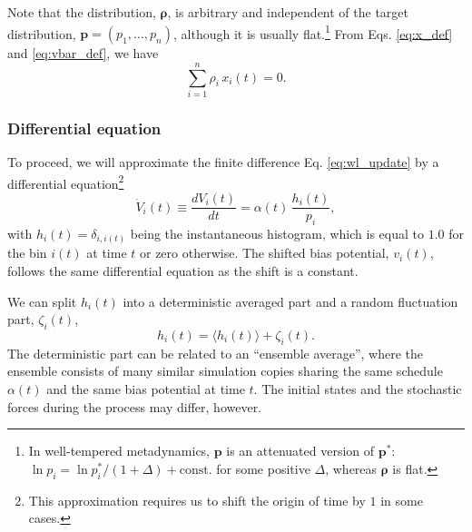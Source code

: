 \documentclass[reprint, superscriptaddress, floatfix]{revtex4-1}
\begin{document}
%
Note that the distribution, $\pmb\rho$, is arbitrary
and independent of
the target distribution,
$\mathbf p = (p_1, \dots, p_n)$,
although it is usually flat.\footnote{In
well-tempered metadynamics,
$\mathbf p$ is an attenuated version of
$\mathbf p^*$\cite{
  barducci2008, dama2014}:
$\ln p_i = \ln {p^*_i}/(1+\Delta) + \mathrm{const.}$ for some positive $\Delta$,
whereas $\pmb\rho$ is flat.}
%
From Eqs. \eqref{eq:x_def} and \eqref{eq:vbar_def},
we have
%
\begin{equation}
  \sum_{i = 1}^n \rho_i \, x_i(t) = 0
  .
\label{eq:rhox_sum}
\end{equation}
%


\subsubsection{Differential equation}



To proceed, we will
approximate the finite difference Eq. \eqref{eq:wl_update}
by a differential equation\footnote{This
approximation requires us to shift the origin of time by $1$ in some cases.}
%
\begin{equation}
  \dot V_i(t)
  \equiv
  \frac{ dV_i(t) } { dt }
  =
  \alpha(t) \, \frac{ h_i(t) } { p_i },
  \label{eq:vt_diffeq}
\end{equation}
%
with
%
$
h_i(t) = \delta_{i, i(t)}
$
%
being the instantaneous histogram,
which is equal to $1.0$
for the bin $i(t)$ at time $t$
or zero otherwise.
%
The shifted bias potential, $v_i(t)$,
follows the same differential equation
as the shift is a constant.


We can split $h_i(t)$ into a deterministic averaged part
and a random fluctuation part, $\zeta_i(t)$,
%
\begin{equation}
  h_i(t) = \langle h_i(t) \rangle + \zeta_i(t).
  \label{eq:h_split}
\end{equation}
%
The deterministic part can be related
to an ``ensemble average'',
where the ensemble consists of many similar simulation copies
sharing the same schedule $\alpha(t)$
and the same bias potential at time $t$.
%
The initial states and the stochastic forces
during the process may differ, however.
\end{document}
